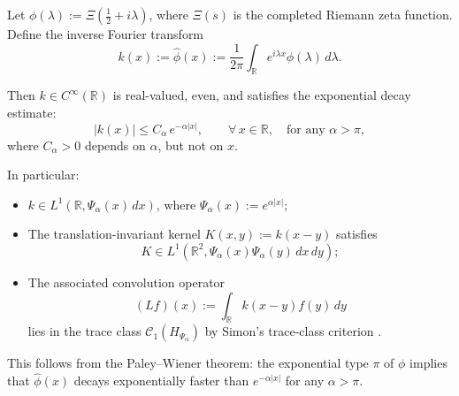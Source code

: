 \begin{lemma}
\label{lem:decay-inverse-fourier-xi}
Let \( \phi(\lambda) := \Xi\left( \tfrac{1}{2} + i\lambda \right) \), where \( \Xi(s) \) is the completed Riemann zeta function. Define the inverse Fourier transform
\[
k(x) := \widehat{\phi}(x) := \frac{1}{2\pi} \int_{\mathbb{R}} e^{i\lambda x} \phi(\lambda)\, d\lambda.
\]

Then \( k \in C^\infty(\mathbb{R}) \) is real-valued, even, and satisfies the exponential decay estimate:
\[
|k(x)| \le C_\alpha\, e^{-\alpha |x|}, \qquad \forall\, x \in \mathbb{R},\quad \text{for any } \alpha > \pi,
\]
where \( C_\alpha > 0 \) depends on \( \alpha \), but not on \( x \).

\medskip
\noindent In particular:
\begin{itemize}
    \item \( k \in L^1(\mathbb{R}, \Psi_\alpha(x)\, dx) \), where \( \Psi_\alpha(x) := e^{\alpha |x|} \);
    \item The translation-invariant kernel \( K(x,y) := k(x - y) \) satisfies
    \[
    K \in L^1(\mathbb{R}^2, \Psi_\alpha(x)\Psi_\alpha(y)\, dx\, dy);
    \]
    \item The associated convolution operator
    \[
    (Lf)(x) := \int_{\mathbb{R}} k(x - y) f(y)\, dy
    \]
    lies in the trace class \( \mathcal{C}_1(H_{\Psi_\alpha}) \) by Simon’s trace-class criterion \cite[Thm.~4.2]{Simon2005TraceIdeals}.
\end{itemize}

\noindent
This follows from the Paley–Wiener theorem: the exponential type \( \pi \) of \( \phi \) implies that \( \widehat{\phi}(x) \) decays exponentially faster than \( e^{-\alpha |x|} \) for any \( \alpha > \pi \).
\end{lemma}
